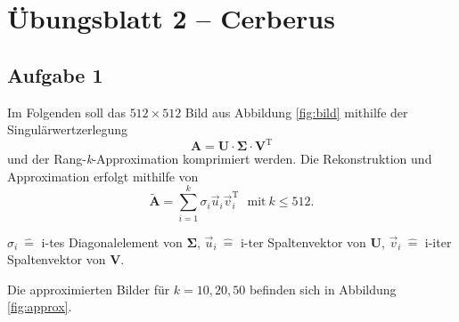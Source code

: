 \documentclass{scrartcl}
\begin{document}
\section*{Übungsblatt 2 -- Cerberus}

    \subsection*{Aufgabe 1}

        Im Folgenden soll das $512 \times 512$ Bild aus Abbildung \ref{fig:bild} mithilfe der Singulärwertzerlegung
        \begin{equation*}
            \mathbf{A} = \mathbf{U} \cdot \mathbf{\Sigma} \cdot \mathbf{V}^{\text{T}}
        \end{equation*}
        und der Rang-\textit{k}-Approximation komprimiert werden.
        Die Rekonstruktion und Approximation erfolgt mithilfe von 
        \begin{equation*}
            \mathbf{\tilde{A}} = \sum_{i = 1}^{k} \sigma_i \vec{u}_i \vec{v}_i^{\text{T}} \:\:\: \text{mit} \: k \leq 512.
        \end{equation*}
        \begin{center}
            \tiny{$\sigma_i \: \hat{=}$ i-tes Diagonalelement von $\mathbf{\Sigma}$, $\vec{u}_i \: \hat{=}$ i-ter Spaltenvektor von $\mathbf{U}$,
                  $\vec{v}_i \: \hat{=}$ i-iter Spaltenvektor von $\mathbf{V}$.}
        \end{center}
        Die approximierten Bilder für $k = 10, 20, 50$ befinden sich in Abbildung \ref{fig:approx}.
\end{document}

